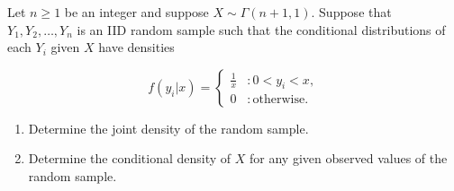 \documentclass[12pt,reqno]{amsart}
\begin{document}
\newpage
\prob Let $n\geq 1$ be an integer and suppose $X\sim \Gamma(n+1,1)$. Suppose that $Y_1,Y_2,\ldots,Y_n$ is an IID random sample such that the conditional distributions of each $Y_i$ given $X$ have densities

	\[
	f(y_i|x) = \begin{cases}
	\frac{1}{x} & : 0 < y_i < x, \\
	0 & : \text{otherwise}.
	\end{cases}
	\]
	
\medskip
\begin{enumerate}
\item Determine the joint density of the random sample.\vfill
\item Determine the conditional density of $X$ for any given observed values of the random sample.\vfill
\end{enumerate}
\end{document}
